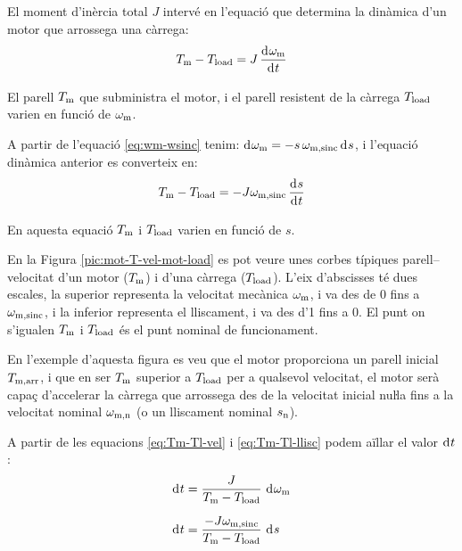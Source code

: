 El moment d'inèrcia total $J$ intervé en l'equació que  determina la dinàmica d'un motor que arrossega una càrrega:
\begin{equation}\label{eq:Tm-Tl-vel}
    T\ped{m} - T\ped{load} = J\,\frac{\diff \omega\ped{m}}{\diff t}
\end{equation}

El parell $T_\mathrm{m}$ que subministra el motor, i el parell resistent de la càrrega $T_\mathrm{load}$ varien en funció de $\omega_\mathrm{m}$.

A partir de l'equació \eqref{eq:wm-wsinc} tenim: $\diff \omega\ped{m} = -s\,\omega\ped{m,sinc} \diff s$, i l'equació dinàmica anterior es converteix en:
\begin{equation}\label{eq:Tm-Tl-llisc}
    T\ped{m} - T\ped{load} = -J \omega\ped{m,sinc}\,\frac{\diff s}{\diff t}
\end{equation}

En aquesta equació $T_\mathrm{m}$ i $T_\mathrm{load}$ varien en funció de $s$.


En la Figura \vref{pic:mot-T-vel-mot-load} es pot veure unes corbes típiques parell--velocitat d'un motor ($T_\mathrm{m}$) i d'una  càrrega ($T_\mathrm{load}$). L'eix d'abscisses té dues escales, la superior representa la velocitat mecànica $\omega_\mathrm{m}$, i va des de 0 fins a $\omega_\mathrm{m,sinc}$, i la inferior representa el lliscament, i va des d'1 fins a 0. El punt on s'igualen $T_\mathrm{m}$ i $T_\mathrm{load}$ és el punt nominal de funcionament.

En l'exemple d'aquesta figura es veu que el motor proporciona un parell inicial $T_\mathrm{m,arr}$, i que en ser $T_\mathrm{m}$  superior a $T_\mathrm{load}$ per a qualsevol velocitat, el motor serà  capaç d'accelerar la càrrega que arrossega des de la velocitat inicial nuŀla fins a la velocitat nominal $\omega_\mathrm{m,n}$ (o un lliscament nominal $s_\mathrm{n}$).
\begin{center}
    
    \label{pic:mot-T-vel-mot-load}
\end{center}

A partir de les equacions \eqref{eq:Tm-Tl-vel} i \eqref{eq:Tm-Tl-llisc} podem aïllar el valor $\diff t$:
\begin{subequations}
\begin{align}
    \diff t &= \frac{J}{T\ped{m}-T\ped{load}}\,\diff\omega\ped{m}\\[1.5ex]
    \diff t &= \frac{-J \omega\ped{m,sinc}}{T\ped{m}-T\ped{load}}\,\diff s
\end{align}
\end{subequations}

